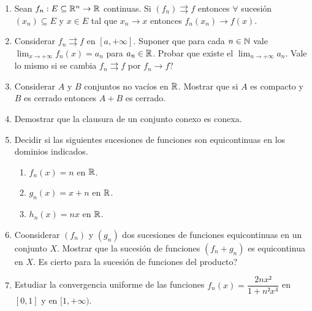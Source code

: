 \begin{enumerate}
  \item Sean \(f_n : E \subseteq \mathbb{R}^n \to \mathbb{R} \) continuas. Si \((f_n) \rightrightarrows f\) entonces \(\forall \) sucesión \((x_n) \subseteq E\) y \(x \in E\) tal que \(x_n \to x\) entonces \(f_n(x_n) \to f(x)\).
  \item Considerar \(f_n \rightrightarrows f\) en \([a, +\infty]\). Suponer que para cada \(n \in \mathbb{N} \) vale \( \lim_{x \to +\infty} f_n(x) = a_n\) para \(a_n \in \mathbb{R} \). Probar que existe el \( \lim_{n \to +\infty} a_n\). Vale lo mismo si se cambia \(f_n \rightrightarrows f\) por \(f_n \to f\)?
  \item Considerar \(A\) y \(B\) conjuntos no vacíos en \(\mathbb{R} \). Mostrar que si \(A\) es compacto y \(B\) es cerrado entonces \(A+B\) es cerrado.
  \item Demostrar que la clausura de un conjunto conexo es conexa.
  \item Decidir si las siguientes sucesiones de funciones son equicontinuas en los dominios indicados.\begin{enumerate}
          \item \(f_n(x) = n\) en \(\mathbb{R} \).
          \item \(g_n(x) = x + n\) en \(\mathbb{R} \).
          \item \(h_n(x) = nx\) en \(\mathbb{R} \).
        \end{enumerate}
  \item Coonsiderar \((f_n)\) y \((g_n)\) dos sucesiones de funciones equicontinuas en un conjunto \(X\). Mostrar que la sucesión de funciones \((f_n + g_n)\) es equicontinua en \(X\). Es cierto para la sucesión de funciones del producto?
  \item Estudiar la convergencia uniforme de las funciones \(f_n(x) = \dfrac{2nx²}{1+n² x^4} \) en \([0, 1]\) y en \([1, +\infty) \).
\end{enumerate}